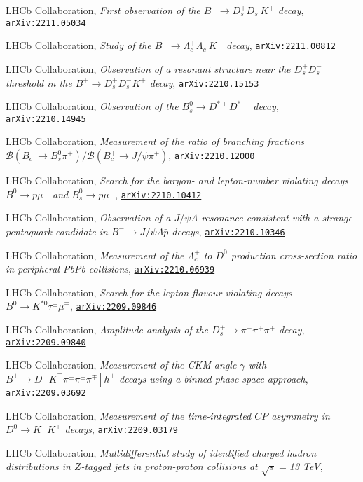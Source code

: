 \documentclass[a4paper, 11pt]{article}
\newenvironment{cvcontent}{
  \leftskip=0.5cm\rightskip=0cm
  \noindent\ignorespaces}{\par}
\newcommand{\arxiv}[1]{\href{https://arxiv.org/abs/#1}{\texttt{arXiv:#1}}}
\begin{document}
\begin{cvcontent}
\begin{enumerate}[label={[\arabic*]}, leftmargin=1.5cm]
    \item LHCb Collaboration,
    \emph{First observation of the $B^+ \rightarrow D_s^+ D_s^- K^+$ decay},
    \arxiv{2211.05034}
    \item LHCb Collaboration,
    \emph{Study of the $B^{-} \to \Lambda_{c}^{+} \bar{\Lambda}_{c}^{-} K^{-}$ decay},
    \arxiv{2211.00812}
    \item LHCb Collaboration,
    \emph{Observation of a resonant structure near the $D_s^+ D_s^-$ threshold in the $B^+\to D_s^+ D_s^- K^+$ decay},
    \arxiv{2210.15153}
    \item LHCb Collaboration,
    \emph{Observation of the $B^0_s \to D^{*+}D^{*-}$ decay},
    \arxiv{2210.14945}
    \item LHCb Collaboration,
    \emph{Measurement of the ratio of branching fractions $\mathcal{B}(B_c^+ \to B_s^0 \pi^+)/\mathcal{B}(B_c^+ \to J/\psi \pi^+)$},
    \arxiv{2210.12000}
    \item LHCb Collaboration,
    \emph{Search for the baryon- and lepton-number violating decays $B^0\to p\mu^-$ and $B^0_s\to p\mu^-$},
    \arxiv{2210.10412}
    \item LHCb Collaboration,
    \emph{Observation of a $J/\psi\Lambda$ resonance consistent with a strange pentaquark candidate in $B^-\to J/\psi\Lambda\bar{p}$ decays},
    \arxiv{2210.10346}
    \item LHCb Collaboration,
    \emph{Measurement of the $\Lambda_c^+$ to $D^0$ production cross-section ratio in peripheral PbPb collisions},
    \arxiv{2210.06939}
    \sloppy
    \item LHCb Collaboration,
    \emph{Search for the lepton-flavour violating decays $B^0 \to K^{*0} \tau^\pm \mu^\mp$},
    \arxiv{2209.09846}
    \item LHCb Collaboration,
    \emph{Amplitude analysis of the $D_s^+ \to \pi^- \pi^+ \pi^+$ decay},
    \arxiv{2209.09840}
    \item LHCb Collaboration,
    \emph{Measurement of the CKM angle $\gamma$ with $ B^\pm \to D \left [ K^\mp \pi^\pm \pi^\pm \pi^\mp \right ] h^\pm$ decays using a binned phase-space approach},
    \arxiv{2209.03692}
    \item LHCb Collaboration,
    \emph{Measurement of the time-integrated $CP$ asymmetry in $D^0\to K^- K^+$ decays},
    \arxiv{2209.03179}
    \item LHCb Collaboration,
    \emph{Multidifferential study of identified charged hadron distributions in $Z$-tagged jets in proton-proton collisions at $\sqrt{s}=$13 TeV},

\end{enumerate}
\end{cvcontent}
\end{document}
